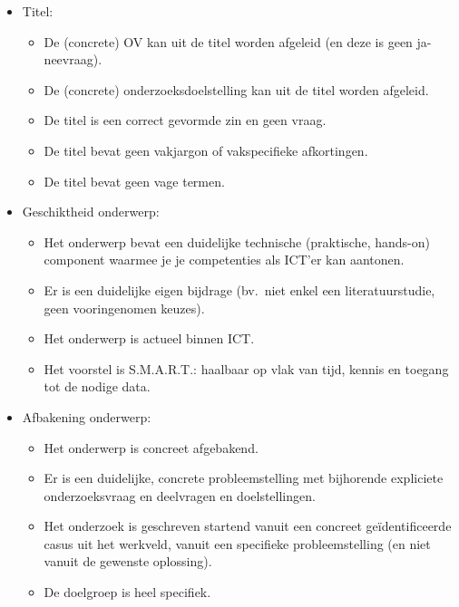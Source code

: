 \begin{itemize}
  \item Titel:
  \begin{itemize}
    \item De (concrete) OV kan uit de titel worden afgeleid (en deze is geen ja-neevraag).
    \item De (concrete) onderzoeksdoelstelling kan uit de titel worden afgeleid.
    \item De titel is een correct gevormde zin en geen vraag.
    \item De titel bevat geen vakjargon of vakspecifieke afkortingen.
    \item De titel bevat geen vage termen.
  \end{itemize}
  \item Geschiktheid onderwerp:
  \begin{itemize}
    \item Het onderwerp bevat een duidelijke technische (praktische, hands-on) component waarmee je je competenties als ICT'er kan aantonen. 
    \item Er is een duidelijke eigen bijdrage (bv.\ niet enkel een literatuurstudie, geen vooringenomen keuzes). 
    \item Het onderwerp is actueel binnen ICT.
    \item Het voorstel is S.M.A.R.T.: haalbaar op vlak van tijd, kennis en toegang tot de nodige data.
  \end{itemize}
  \item Afbakening onderwerp:
  \begin{itemize}
    \item Het onderwerp is concreet afgebakend. 
    \item Er is een duidelijke, concrete probleemstelling met bijhorende expliciete onderzoeksvraag en deelvragen en doelstellingen.
    \item Het onderzoek is geschreven startend vanuit een concreet geïdentificeer\-de casus uit het werkveld, vanuit een specifieke probleemstelling (en niet vanuit de gewenste oplossing).
    \item De doelgroep is heel specifiek. 
  \end{itemize}
\end{itemize}

